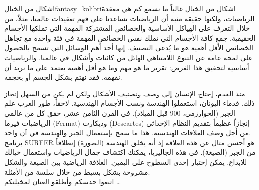 \begin{surferIntroPage}{اشكال من الخيال}{fantasy_kolibri}{اشكال من الخيال}
غالباً ما نسمع كم هي معقدة الرياضيات، ولكنها حقيقة مثبة أن الرياضيات تساعدنا على فهم تعقيدات عالمنا، مثلاً، من خلال التعرف على الهياكل الأساسية والخصائص المشتركة المهمة التي تملكها الأجسام الحقيقية. جمع كافة الأجسام التي تملك نفس الخصائص المهمة في فئة واحدة مع تجاهل الخصائص الأقل أهمية هو ما يُدعى التصنيف. إنها أحد أهم الوسائل التي تسمح بالحصول على لمحة عامة عن التنوع اللامتناهي الهائل من كائنات وأشكال في عالمنا. والرياضيات أساسية لتحقيق هذا الغرض: تقرير ما هو مهم وما هو أقل أهمية يعتمد على ما نريد أن نفهمه. فقد نهتم بشكل الجسم أو بحجمه.
 \\

\vspace{0.4cm}

منذ القدم، إحتاج الإنسان إلى وصف وتصنيف الأشكال ولكن لم يكن من السهل إنجاز ذلك. قدماء اليونان، استعملوا الهندسة ونسب الأجسام الهندسية. لاحقاً، طور العرب علم الجبر (الخوارزمي، 900 قبل الميلاد). في القرن الثامن عشر، حقق كل من عالمي الرياضيات فيرما
 \textenglish{(Fermat)}
  وديكارت
 \textenglish{(Descartes)}
    إنجازاً عظيماً بتقديم النظام الإحداثي من أجل وصف العلاقات الهندسية. هذا ما سمح بإستعمال الجبر والهندسة في آن واحد.
\\
\vspace{0.4cm}
برنامج SURFER هو أحسن مثال عن هذه العلاقة إذ أنه يخلق الهندسة (الصورة) إنطلاقاً من الجبر (الصيغة).
في هذه الجاليريا، يمكنك اكتشاف جمال الرياضيات واستعمال خيالك للإبداع. يمكن إختيار إحدى السطوح على اليمين. العلاقة الرياضية بين الصيغة والشكل مشروحة بشكل بسيط من خلال سلسة من الأمثلة.\\
اتبعوا حدسكم وأطلقو العنان لمخيلتكم \dots
\end{surferIntroPage}
